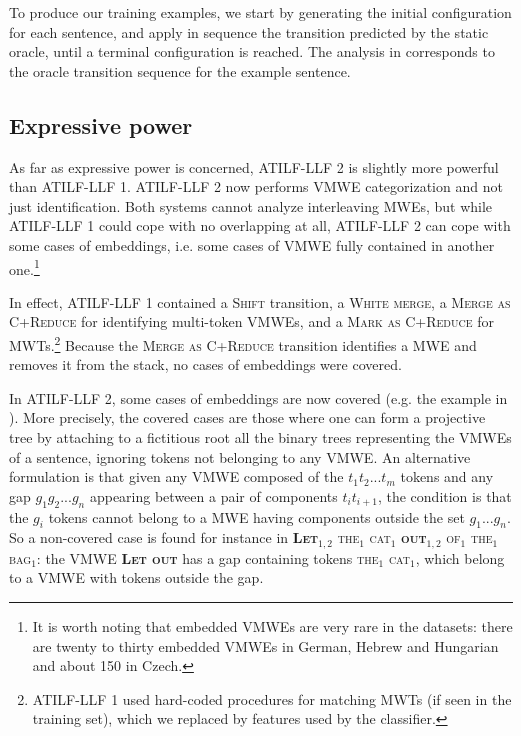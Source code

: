 \documentclass[output=paper,modfonts]{langscibook}
\begin{document}
To produce our training examples, we start by generating the initial configuration for each sentence, and apply in sequence the transition predicted by the static oracle, until a terminal configuration is reached. 
The analysis in  corresponds to the oracle transition sequence for the example sentence.
\subsection{Expressive power}
As far as expressive power is concerned, ATILF-LLF 2 is slightly more powerful than ATILF-LLF 1. ATILF-LLF 2 now performs VMWE categorization and not just identification. Both systems cannot analyze interleaving MWEs, but while ATILF-LLF 1 could cope with no overlapping at all, ATILF-LLF 2 can cope with some cases of embeddings, i.e. some cases of VMWE fully contained in another one.\footnote{It is worth noting that embedded VMWEs are very rare in the datasets: there are twenty to thirty embedded VMWEs in German, Hebrew and Hungarian and about 150 in Czech.}

In effect, ATILF-LLF 1 contained a \textsc{Shift} transition, a \textsc{White merge}, a \textsc{Merge as C+Reduce} for identifying multi-token VMWEs, and a \textsc{Mark as C+Reduce} for MWTs.\footnote{ATILF-LLF 1 used hard-coded procedures for matching MWTs (if seen in the training set), which we replaced by features used by the classifier.} Because the \textsc{Merge as C+Reduce} transition identifies a MWE and removes it from the stack, no cases of embeddings were covered.

In ATILF-LLF 2, some cases of embeddings are now covered (e.g. the example in ). More precisely, the covered cases are those where one can form a projective tree by attaching to a fictitious root all the binary trees representing the VMWEs of a sentence, ignoring tokens not belonging to any VMWE. An alternative formulation is that given any VMWE composed of the $t_1 t_2 ... t_m$ tokens and any gap $g_1 g_2 ... g_n$ appearing between a pair of components $t_i t_{i+1}$, the condition is that the $g_i$ tokens cannot belong to a MWE having components outside the set $g_1 ... g_n$. So a non-covered case is found for instance in \textsc{\textbf{{Let$_{1,2}$}} {the$_{1}$} {cat$_{1}$} \textbf{{out$_{1,2}$}} {of$_{1}$} {the$_{1}$}  {bag$_{1}$}}: the VMWE \textsc{\textbf{Let out}} has a gap containing tokens \textsc{{the$_{1}$} {cat$_{1}$}}, which belong to a VMWE with tokens outside the gap.
\end{document}
